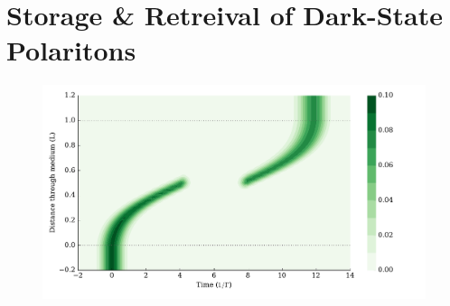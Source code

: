 \section{Storage \& Retreival of Dark-State Polaritons}
  \label{sec:polaritons_storage}

    \begin{figure}[h]
      \includegraphics[width=\linewidth]
        {figs/04_polaritons/pls_p0_2pi_t1_Ng5e3_c10_gaussian_w0_5_storage_4_fig1.pdf}
      \caption{}
      \label{fig:autler_townes}
    \end{figure}

